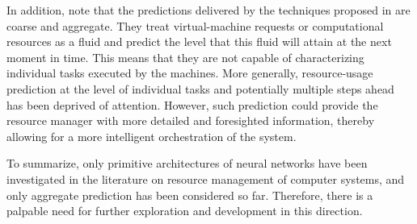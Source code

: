 In addition, note that the predictions delivered by the techniques proposed in
\cite{cao2014, dabbagh2015, ismaeel2015} are coarse and aggregate. They treat
virtual-machine requests or computational resources as a fluid and predict the
level that this fluid will attain at the next moment in time. This means that
they are not capable of characterizing individual tasks executed by the
machines. More generally, resource-usage prediction at the level of individual
tasks and potentially multiple steps ahead has been deprived of attention.
However, such prediction could provide the resource manager with more detailed
and foresighted information, thereby allowing for a more intelligent
orchestration of the system.

To summarize, only primitive architectures of neural networks have been
investigated in the literature on resource management of computer systems, and
only aggregate prediction has been considered so far. Therefore, there is a
palpable need for further exploration and development in this direction.
